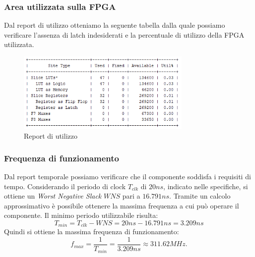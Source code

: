 \subsubsection{Area utilizzata sulla FPGA}
Dal report di utilizzo otteniamo la seguente tabella dalla quale possiamo verificare l'assenza di latch indesiderati e la percentuale di utilizzo della FPGA utilizzata.
\begin{figure}[H]
    \centering
    \includegraphics[width=0.75\textwidth]{figures/report_utilization.png}
    \caption{Report di utilizzo}
    \label{fig:report_utilization}
\end{figure}

\subsubsection{Frequenza di funzionamento}
Dal report temporale possiamo verificare che il componente soddisfa i requisiti di tempo. Considerando il periodo di clock $T_{clk}$ di $20 ns$, indicato nelle specifiche, si ottiene un  \textit{Worst Negative Slack} $WNS$ pari a $16.791ns$. Tramite un calcolo approssimativo è possibile ottenere la massima frequenza a cui può operare il componente.
\newline
Il minimo periodo utilizzabile risulta:
\begin{equation}
    T_{min} = T_{clk} - WNS = 20 ns - 16.791 ns = 3.209 ns
\end{equation}
Quindi si ottiene la massima frequenza di funzionamento:
\begin{equation}
    f_{max} = \frac{1}{T_{min}} = \frac{1}{3.209 ns} \approx 311.62 MHz.
\end{equation}
